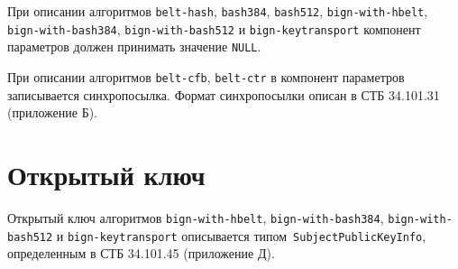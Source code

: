 При описании алгоритмов 
\texttt{belt-hash}, \texttt{bash384}, \texttt{bash512},
\texttt{bign-with-hbelt}, \texttt{bign-with-bash384}, 
\texttt{bign-with-bash512} и \texttt{bign-keytransport} компонент параметров 
должен принимать значение \texttt{NULL}.

При описании алгоритмов \texttt{belt-cfb}, \texttt{belt-ctr}
в компонент параметров записывается синхропосылка.
Формат синхропосылки описан в СТБ 34.101.31 (приложение Б).

\section{Открытый ключ}\label{CRYPTO.Pubkey}

Открытый ключ алгоритмов \texttt{bign-with-hbelt}, \texttt{bign-with-bash384}, 
\texttt{bign-with-bash512} и \texttt{bign-keytransport}
описывается типом~\texttt{SubjectPublicKeyInfo}, 
определенным в СТБ 34.101.45 (приложение Д).

